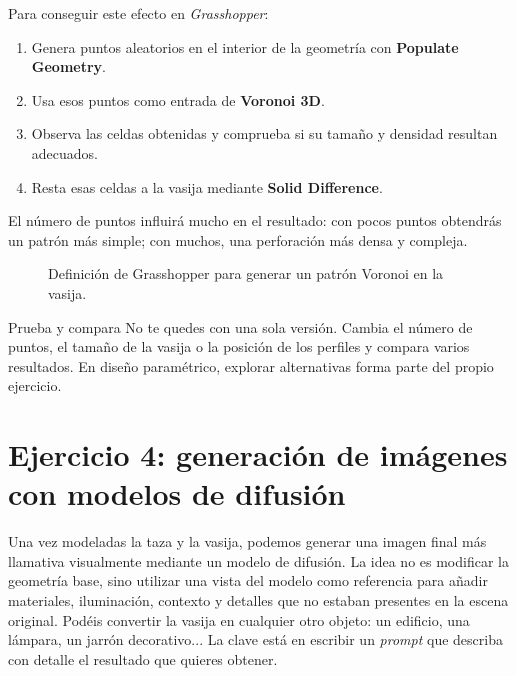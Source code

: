 \documentclass[
  spanish,
  11pt,
  a4paper,
  DIV=11,
  numbers=noendperiod]{scrartcl}
\providecommand{\tightlist}{\setlength{\itemsep}{0pt}\setlength{\parskip}{0pt}}
\begin{document}
Para conseguir este efecto en \emph{Grasshopper}:

\begin{enumerate}
\tightlist
\item Genera puntos aleatorios en el interior de la geometría con \textbf{Populate Geometry}.
\item Usa esos puntos como entrada de \textbf{Voronoi 3D}.
\item Observa las celdas obtenidas y comprueba si su tamaño y densidad resultan adecuados.
\item Resta esas celdas a la vasija mediante \textbf{Solid Difference}.
\end{enumerate}

El número de puntos influirá mucho en el resultado: con pocos puntos obtendrás un patrón más simple; con muchos, una perforación más densa y compleja.

\begin{figure}[H]
\caption{Definición de Grasshopper para generar un patrón Voronoi en la vasija.}\label{fig-voronoi-grafo}
\end{figure}

\begin{PracticeTipBox}{Prueba y compara}
No te quedes con una sola versión. Cambia el número de puntos, el tamaño de la vasija o la posición de los perfiles y compara varios resultados. En diseño paramétrico, explorar alternativas forma parte del propio ejercicio.
\end{PracticeTipBox}

\section{Ejercicio 4: generación de imágenes con modelos de difusión}
\label{ejercicio-4-generacion-de-imagenes-con-modelos-de-difusion}

Una vez modeladas la taza y la vasija, podemos generar una imagen final más llamativa visualmente mediante un modelo de difusión. La idea no es modificar la geometría base, sino utilizar una vista del modelo como referencia para añadir materiales, iluminación, contexto y detalles que no estaban presentes en la escena original. Podéis convertir la vasija en cualquier otro objeto: un edificio, una lámpara, un jarrón decorativo... La clave está en escribir un \emph{prompt} que describa con detalle el resultado que quieres obtener.
\end{document}
